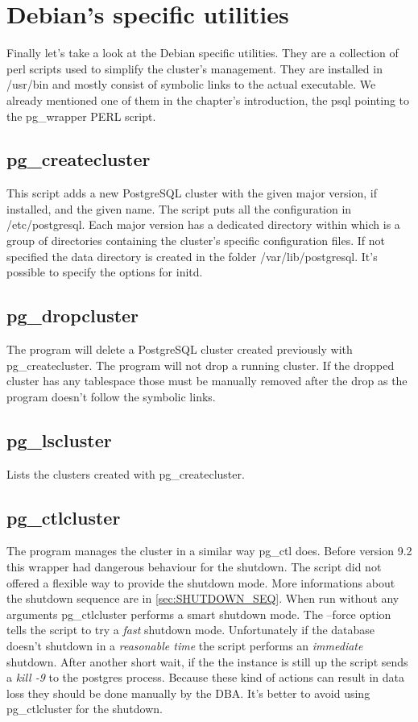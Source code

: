 \section{Debian's specific utilities}
Finally let's take a look at the Debian specific utilities. They are a collection of perl scripts
used to simplify the cluster's management. They are installed in /usr/bin and mostly consist of symbolic
links to the actual executable. We already mentioned one of them in the chapter's introduction, the
psql pointing to the pg\_wrapper PERL script.

\subsection{pg\_createcluster}
This script adds a new PostgreSQL cluster with the given major version, if installed, and the
given name. The script puts all the configuration in /etc/postgresql. Each major version has a
dedicated directory within which is a group of directories containing the cluster's specific
configuration files. If not specified the data directory is created in the folder
/var/lib/postgresql. It's possible to specify the options for initd.

\subsection{pg\_dropcluster}
The program will delete a PostgreSQL cluster created previously with pg\_createcluster. The
program will not drop a running cluster. If the dropped cluster has any tablespace those must be
manually removed after the drop as the program doesn't follow the symbolic links.

\subsection{pg\_lscluster}
Lists the clusters created with pg\_createcluster.

\subsection{pg\_ctlcluster}
\label{sub:PGCTLDEB}
The program manages the cluster in a similar way pg\_ctl does.
Before version 9.2 this wrapper had dangerous behaviour for the shutdown. The script did not
offered a flexible way to provide the shutdown mode. More informations about the shutdown
sequence are in \ref{sec:SHUTDOWN_SEQ}.
When run without any arguments pg\_ctlcluster performs a smart shutdown mode.
The --force option tells the script to try a \textit{fast} shutdown mode. Unfortunately if the
database doesn't shutdown in a \textit{reasonable time} the script performs an \textit{immediate}
shutdown. After another short wait, if the the instance is still up the script sends a
\textit{kill -9} to the postgres process. Because these kind of actions can result in data loss
they should be done manually by the DBA. It's better to avoid using pg\_ctlcluster for the shutdown.
